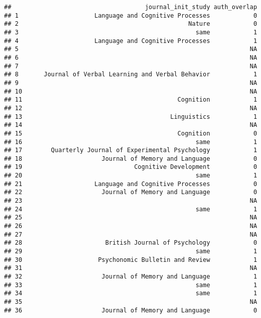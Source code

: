\documentclass[
  english,
  man]{apa6}
\begin{document}
\begin{verbatim}
##                                     journal_init_study auth_overlap
## 1                     Language and Cognitive Processes            0
## 2                                               Nature            0
## 3                                                 same            1
## 4                     Language and Cognitive Processes            1
## 5                                                                NA
## 6                                                                NA
## 7                                                                NA
## 8       Journal of Verbal Learning and Verbal Behavior            1
## 9                                                                NA
## 10                                                               NA
## 11                                           Cognition            1
## 12                                                               NA
## 13                                         Linguistics            1
## 14                                                               NA
## 15                                           Cognition            0
## 16                                                same            1
## 17        Quarterly Journal of Experimental Psychology            1
## 18                      Journal of Memory and Language            0
## 19                               Cognitive Development            0
## 20                                                same            1
## 21                    Language and Cognitive Processes            0
## 22                      Journal of Memory and Language            0
## 23                                                               NA
## 24                                                same            1
## 25                                                               NA
## 26                                                               NA
## 27                                                               NA
## 28                       British Journal of Psychology            0
## 29                                                same            1
## 30                     Psychonomic Bulletin and Review            1
## 31                                                               NA
## 32                      Journal of Memory and Language            1
## 33                                                same            1
## 34                                                same            1
## 35                                                               NA
## 36                      Journal of Memory and Language            0

\end{verbatim}
\end{document}
